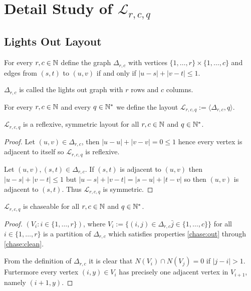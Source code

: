 \chapter{Detail Study of $\mathcal{L}_{r,c,q}$}\label{chapter:detail}

\section{Lights Out Layout}

\begin{definition}
	For every $r,c\in\mathbb{N}$ define the graph $\Delta_{r,c}$ with vertices
	$\{1,\ldots,r\}\times\{1,\ldots,c\}$ and edges from $(s,t)$ to $(u,v)$
	if and only if $|u-s|+|v-t| \le 1$.
		
	$\Delta_{r,c}$ is called the lights out graph with $r$ rows and $c$
	columns.
\end{definition}

\begin{definition}
	For every $r,c\in\mathbb{N}$ and every $q\in\mathbb{N}^{*}$ we define the layout
	$\mathcal{L}_{r,c,q} := \langle\Delta_{r,c},q\rangle$.
\end{definition}

\begin{theorem}
	$\mathcal{L}_{r,c,q}$ is a reflexive, symmetric layout for all
	$r,c\in\mathbb{N}$ and $q\in\mathbb{N}^{*}$.
\end{theorem}

\begin{proof}
	Let $(u,v)\in\Delta_{r,c}$, then $|u-u|+|v-v| = 0 \le 1$ hence every
	vertex is adjacent to itself so $\mathcal{L}_{r,c,q}$ is reflexive.
	
	Let $(u,v),(s,t)\in\Delta_{r,c}$. If $(s,t)$ is adjacent to $(u,v)$ then
	$|u-s| + |v-t| \le 1$ but $|u-s| + |v-t| = |s-u| + |t-v|$ so then
	$(u,v)$ is adjacent to $(s,t)$. Thus $\mathcal{L}_{r,c,q}$ is symmetric.
\end{proof}

\begin{theorem}
	$\mathcal{L}_{r,c,q}$ is chaseable for all $r,c\in\mathbb{N}$ and $q\in\mathbb{N}^{*}$.
\end{theorem}

\begin{proof}
	$(V_{i} : i \in \{1,\ldots,r\})$, where $V_{i} := \{(i,j)\in\Delta_{r,c}
	\bar j \in \{1,\ldots,c\}\}$ for all $i\in\{1,\ldots,r\}$ is a partition
	of $\Delta_{r,c}$ which satisfies properties \ref{chase:out} through
	\ref{chase:clean}.
	
	From the definition of $\Delta_{r,c}$ it is clear that $N(V_{i}) \cap
	N(V_{j}) = 0$ if $|j-i| > 1$. Furtermore every vertex $(i,y)\in V_{i}$
	has precisely one adjacent vertex in $V_{i+1}$, namely $(i+1,y)$. 
\end{proof}

